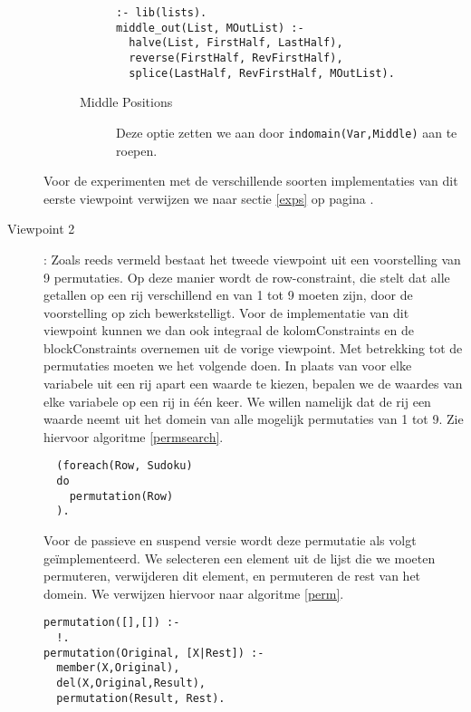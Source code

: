 \begin{description}
\begin{description}
\begin{description}
\begin{algorithm}
\caption{middleout(List, MOutList)}
\label{middleout}
\begin{verbatim}
:- lib(lists).
middle_out(List, MOutList) :-
  halve(List, FirstHalf, LastHalf),
  reverse(FirstHalf, RevFirstHalf),
  splice(LastHalf, RevFirstHalf, MOutList).
\end{verbatim}
\end{algorithm}
                 \item[Middle Positions] Deze optie zetten we aan door \verb|indomain(Var,Middle)| aan te roepen. 
                \end{description}
        \end{description}
Voor de experimenten met de verschillende soorten implementaties van dit eerste viewpoint verwijzen we 
naar sectie \ref{exps} op pagina \pageref{exps}.
 \item[Viewpoint 2]:
Zoals reeds vermeld bestaat het tweede viewpoint uit een voorstelling van 9 permutaties. Op deze manier
wordt de row-constraint, die stelt dat alle getallen op een rij verschillend en van 1 tot 9 moeten zijn, 
door de voorstelling op zich bewerkstelligt. Voor de implementatie van dit viewpoint kunnen we dan ook
integraal de kolomConstraints en de blockConstraints overnemen uit de vorige viewpoint. Met betrekking
tot de permutaties moeten we het volgende doen. In plaats van voor elke variabele uit een rij apart
een waarde te kiezen, bepalen we de waardes van elke variabele op een rij in \'e\'en keer. We willen namelijk
dat de rij een waarde neemt uit het domein van alle mogelijk permutaties van 1 tot 9. Zie hiervoor algoritme
\ref{permsearch}.
\begin{algorithm}
\caption{search(Sudoku)}
\label{permsearch}
\begin{verbatim}
  (foreach(Row, Sudoku)
  do
    permutation(Row)
  ).
\end{verbatim}
\end{algorithm}
Voor de passieve en suspend versie wordt deze permutatie als volgt ge\"implementeerd. We selecteren
een element uit de lijst die we moeten permuteren, verwijderen dit element, en permuteren de rest
van het domein. We verwijzen hiervoor naar algoritme \ref{perm}.
\begin{algorithm}
\caption{permutation}
\label{perm}
\begin{verbatim}
permutation([],[]) :-
  !.
permutation(Original, [X|Rest]) :-
  member(X,Original),
  del(X,Original,Result),
  permutation(Result, Rest).
\end{verbatim}

\end{algorithm}
\end{description}
